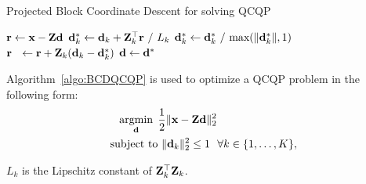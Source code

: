 \documentclass[10pt,twocolumn,letterpaper]{article}
\begin{document}
\begin{algorithm}
\caption{Projected Block Coordinate Descent for solving QCQP} \label{algo:BCDQCQP}
\begin{algorithmic}[1]
\State $\Vector{r} \gets \signal - \Code \filter $
        \State $ \filter^{\ast}_k \gets \filter_k + \Code_k ^ \top \Vector{r} ~ / ~ L_k $
        \State $ \filter^{\ast}_k \gets \filter^{\ast}_k ~ / ~ \text{max}( \|\filter^{\ast}_k\|,1 ) $
        \State $ \Vector{r} ~~ \gets \Vector{r} + \Code_k( \filter_k - \filter^{\ast}_k ) $
    \EndFor
    \State  $ \filter \gets \filter^{\ast} $
\EndWhile
\end{algorithmic}
\end{algorithm}


Algorithm~\ref{algo:BCDQCQP} is used to optimize a QCQP problem in the following form:
\begin{equation}
\begin{split}
    \minimize{\filter} & \frac{1}{2}\|\signal - \Code \filter \|_2^2 \\
    \text{subject to} & ~ \|\filter_k\|^2_2 \leq 1 ~~ \forall k \in \{1,\dots,K\},
\end{split}
\end{equation}

$L_k$ is the Lipschitz constant of $\Code_k^\top \Code_k$.
\end{document}
